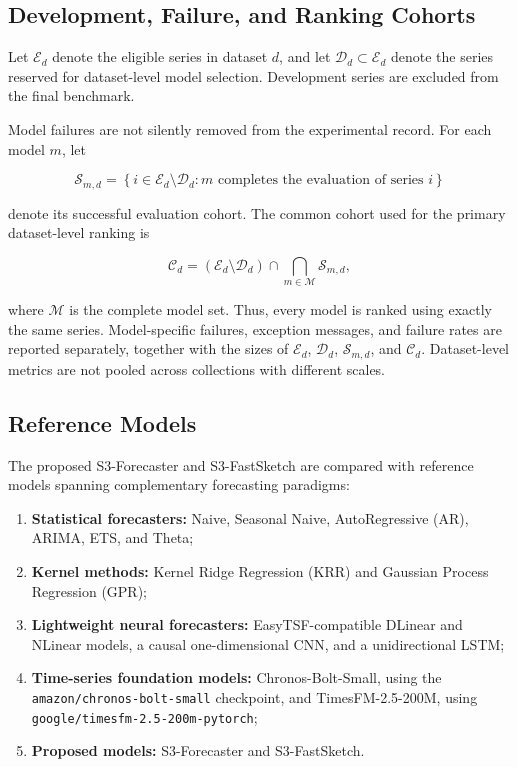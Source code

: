 \documentclass[review,number,sort&compress]{elsarticle}
\begin{document}
\subsection{Development, Failure, and Ranking Cohorts}
\label{subsec:cohorts}

Let \(\mathcal{E}_d\) denote the eligible series in dataset \(d\), and let \(\mathcal{D}_d\subset\mathcal{E}_d\) denote the series reserved for dataset-level model selection. Development series are excluded from the final benchmark.

Model failures are not silently removed from the experimental record. For each model \(m\), let

\begin{equation}
\mathcal{S}_{m,d}
=
\left\{
i\in\mathcal{E}_d\setminus\mathcal{D}_d:
m \text{ completes the evaluation of series } i
\right\}
\label{eq:successful_cohort}
\end{equation}

denote its successful evaluation cohort. The common cohort used for the primary dataset-level ranking is

\begin{equation}
\mathcal{C}_d
=
\left(
\mathcal{E}_d\setminus\mathcal{D}_d
\right)
\cap
\bigcap_{m\in\mathcal{M}}\mathcal{S}_{m,d},
\label{eq:common_cohort}
\end{equation}

where \(\mathcal{M}\) is the complete model set. Thus, every model is ranked using exactly the same series. Model-specific failures, exception messages, and failure rates are reported separately, together with the sizes of \(\mathcal{E}_d\), \(\mathcal{D}_d\), \(\mathcal{S}_{m,d}\), and \(\mathcal{C}_d\). Dataset-level metrics are not pooled across collections with different scales.

\subsection{Reference Models}
\label{subsec:baselines}

The proposed S3-Forecaster and S3-FastSketch are compared with reference models spanning complementary forecasting paradigms:

\begin{enumerate}
    \item \textbf{Statistical forecasters:} Naive, Seasonal Naive, AutoRegressive (AR), ARIMA, ETS, and Theta;
    \item \textbf{Kernel methods:} Kernel Ridge Regression (KRR) and Gaussian Process Regression (GPR);
    \item \textbf{Lightweight neural forecasters:} EasyTSF-compatible DLinear and NLinear models, a causal one-dimensional CNN, and a unidirectional LSTM;
    \item \textbf{Time-series foundation models:} Chronos-Bolt-Small, using the \texttt{amazon/chronos-bolt-small} checkpoint, and TimesFM-2.5-200M, using \texttt{google/timesfm-2.5-200m-pytorch};
    \item \textbf{Proposed models:} S3-Forecaster and S3-FastSketch.
\end{enumerate}
\end{document}
